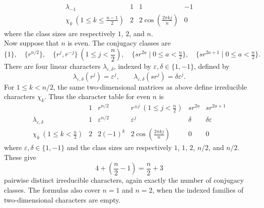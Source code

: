 \documentclass[../Odyssey_Project.tex]{subfiles}
\begin{document}
\begin{solution}
\[\begin{array}{c|ccc}
            \lambda_{-1}&1&1&-1\\
            \chi_k\ \left(1\leq k\leq\frac{n-1}{2}\right)&2&2\cos\left(\frac{2\pi kj}{n}\right)&0
        \end{array}
    \]
    where the class sizes are respectively $1$, $2$, and $n$.\\
    Now suppose that $n$ is even. The conjugacy classes are
    \[
        \{1\},\quad
        \{r^{n/2}\},\quad
        \{r^j,r^{-j}\}\ \left(1\leq j<\frac n2\right),\quad
        \{sr^{2a}\mid0\leq a<\tfrac n2\},\quad
        \{sr^{2a+1}\mid0\leq a<\tfrac n2\}.
    \]
    There are four linear characters $\lambda_{\varepsilon,\delta}$, indexed by $\varepsilon,\delta\in\{1,-1\}$, defined by
    \[
        \lambda_{\varepsilon,\delta}(r^j)=\varepsilon^j,
        \qquad
        \lambda_{\varepsilon,\delta}(sr^j)=\delta\varepsilon^j.
    \]
    For $1\leq k<n/2$, the same two-dimensional matrices as above define irreducible characters $\chi_k$. Thus the character table for even $n$ is
    \[
        \begin{array}{c|ccccc}
            &1&r^{n/2}&r^{\pm j}\ \left(1\leq j<\frac n2\right)&sr^{2a}&sr^{2a+1}\\
            \hline
            \lambda_{\varepsilon,\delta}&1&\varepsilon^{n/2}&\varepsilon^j&\delta&\delta\varepsilon\\
            \chi_k\ \left(1\leq k<\frac n2\right)&2&2(-1)^k&2\cos\left(\frac{2\pi kj}{n}\right)&0&0
        \end{array}
    \]
    where $\varepsilon,\delta\in\{1,-1\}$ and the class sizes are respectively $1$, $1$, $2$, $n/2$, and $n/2$. These give
    \[
        4+\left(\frac n2-1\right)=\frac n2+3
    \]
    pairwise distinct irreducible characters, again exactly the number of conjugacy classes. The formulas also cover $n=1$ and $n=2$, when the indexed families of two-dimensional characters are empty.
\end{solution}
\end{document}
